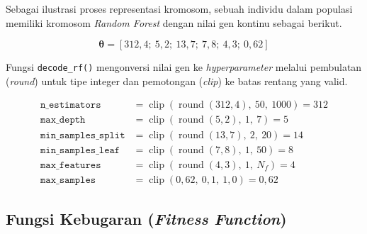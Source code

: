 Sebagai ilustrasi proses representasi kromosom, sebuah individu dalam populasi memiliki kromosom \textit{Random Forest} dengan nilai gen kontinu sebagai berikut.

\begin{equation}
\boldsymbol{\theta} = [312{,}4;\ 5{,}2;\ 13{,}7;\ 7{,}8;\ 4{,}3;\ 0{,}62]
\end{equation}

Fungsi \texttt{decode\_rf()} mengonversi nilai gen ke \textit{hyperparameter} melalui pembulatan (\textit{round}) untuk tipe integer dan pemotongan (\textit{clip}) ke batas rentang yang valid.

\begin{align}
\texttt{n\_estimators}       &= \operatorname{clip}\!\left(\operatorname{round}(312{,}4),\ 50,\ 1000\right) = 312 \nonumber \\
\texttt{max\_depth}          &= \operatorname{clip}\!\left(\operatorname{round}(5{,}2),\ 1,\ 7\right)       = 5   \nonumber \\
\texttt{min\_samples\_split} &= \operatorname{clip}\!\left(\operatorname{round}(13{,}7),\ 2,\ 20\right)     = 14  \nonumber \\
\texttt{min\_samples\_leaf}  &= \operatorname{clip}\!\left(\operatorname{round}(7{,}8),\ 1,\ 50\right)      = 8   \nonumber \\
\texttt{max\_features}       &= \operatorname{clip}\!\left(\operatorname{round}(4{,}3),\ 1,\ N_f\right)     = 4   \nonumber \\
\texttt{max\_samples}        &= \operatorname{clip}(0{,}62,\ 0{,}1,\ 1{,}0)                               = 0{,}62
\end{align}


\subsection{Fungsi Kebugaran (\textit{Fitness Function})}
\label{subsec:fitness_ga}

